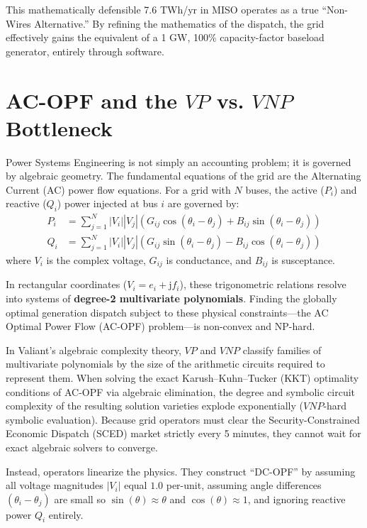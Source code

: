 \documentclass[11pt, a4paper]{article}
\begin{document}
This mathematically defensible 7.6 TWh/yr in MISO operates as a true ``Non-Wires Alternative.'' By refining the mathematics of the dispatch, the grid effectively gains the equivalent of a 1 GW, 100\% capacity-factor baseload generator, entirely through software.

\section{AC-OPF and the $VP$ vs. $VNP$ Bottleneck}

Power Systems Engineering is not simply an accounting problem; it is governed by algebraic geometry. The fundamental equations of the grid are the Alternating Current (AC) power flow equations. For a grid with $N$ buses, the active ($P_i$) and reactive ($Q_i$) power injected at bus $i$ are governed by:
\begin{align}
 P_i &= \sum_{j=1}^{N} |V_i| |V_j| \left( G_{ij} \cos(\theta_i - \theta_j) + B_{ij} \sin(\theta_i - \theta_j) \right) \\
 Q_i &= \sum_{j=1}^{N} |V_i| |V_j| \left( G_{ij} \sin(\theta_i - \theta_j) - B_{ij} \cos(\theta_i - \theta_j) \right)
\end{align}
where $V_i$ is the complex voltage, $G_{ij}$ is conductance, and $B_{ij}$ is susceptance. 

In rectangular coordinates ($V_i = e_i + \mathrm{j} f_i$), these trigonometric relations resolve into systems of \textbf{degree-2 multivariate polynomials}. Finding the globally optimal generation dispatch subject to these physical constraints---the AC Optimal Power Flow (AC-OPF) problem---is non-convex and NP-hard. 

In Valiant's algebraic complexity theory, $VP$ and $VNP$ classify families of multivariate polynomials by the size of the arithmetic circuits required to represent them. When solving the exact Karush--Kuhn--Tucker (KKT) optimality conditions of AC-OPF via algebraic elimination, the degree and symbolic circuit complexity of the resulting solution varieties explode exponentially ($VNP$-hard symbolic evaluation). Because grid operators must clear the Security-Constrained Economic Dispatch (SCED) market strictly every 5 minutes, they cannot wait for exact algebraic solvers to converge.

Instead, operators linearize the physics. They construct ``DC-OPF'' by assuming all voltage magnitudes $|V_i|$ equal $1.0$ per-unit, assuming angle differences $(\theta_i - \theta_j)$ are small so $\sin(\theta) \approx \theta$ and $\cos(\theta) \approx 1$, and ignoring reactive power $Q_i$ entirely. 
\end{document}
